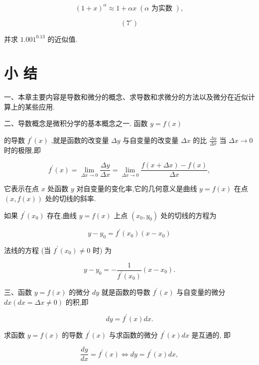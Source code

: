 \documentclass[10pt]{article}
\begin{document}
\[
{\left( 1 + x\right) }^{\alpha } \approx 1 + {\alpha x}\;\left( {\alpha \text{ 为实数 }}\right) ,
\]

\[
\left( {7}^{ \circ }\right)
\]

并求 \({1.001}^{0.13}\) 的近似值.

\section*{小 结}

一、本章主要内容是导数和微分的概念、求导数和求微分的方法以及微分在近似计算上的某些应用.

二、导数概念是微积分学的基本概念之一. 函数 \(y = f\left( x\right)\)

的导数 \({f}^{\prime }\left( x\right)\) ,就是函数的改变量 \({\Delta y}\) 与自变量的改变量 \({\Delta x}\) 的比 \(\frac{\Delta y}{\Delta x}\) 当 \({\Delta x} \rightarrow 0\) 时的极限,即

\[
{f}^{\prime }\left( x\right) = \mathop{\lim }\limits_{{{\Delta x} \rightarrow 0}}\frac{\Delta y}{\Delta x} = \mathop{\lim }\limits_{{{\Delta x} \rightarrow 0}}\frac{f\left( {x + {\Delta x}}\right) - f\left( x\right) }{\Delta x},
\]

它表示在点 \(x\) 处函数 \(y\) 对自变量的变化率,它的几何意义是曲线 \(y = f\left( x\right)\) 在点 \(\left( {x,f\left( x\right) }\right)\) 处的切线的斜率.

如果 \({f}^{\prime }\left( {x}_{0}\right)\) 存在,曲线 \(y = f\left( x\right)\) 上点 \(\left( {{x}_{0},{y}_{0}}\right)\) 处的切线的方程为

\[
y - {y}_{0} = {f}^{\prime }\left( {x}_{0}\right) \left( {x - {x}_{0}}\right)
\]

法线的方程 (当 \({f}^{\prime }\left( {x}_{0}\right) \neq 0\) 时) 为

\[
y - {y}_{0} = - \frac{1}{{f}^{\prime }\left( {x}_{0}\right) }\left( {x - {x}_{0}}\right) .
\]

三、函数 \(y = f\left( x\right)\) 的微分 \({dy}\) 就是函数的导数 \({f}^{\prime }\left( x\right)\) 与自变量的微分 \({dx}\left( {{dx} = {\Delta x} \neq 0}\right)\) 的积,即

\[
{dy} = {f}^{\prime }\left( x\right) {dx}.
\]

求函数 \(y = f\left( x\right)\) 的导数 \({f}^{\prime }\left( x\right)\) 与求函数的微分 \({f}^{\prime }\left( x\right) {dx}\) 是互通的, 即

\[
\frac{dy}{dx} = {f}^{\prime }\left( x\right) \Leftrightarrow {dy} = {f}^{\prime }\left( x\right) {dx},
\]
\end{document}

